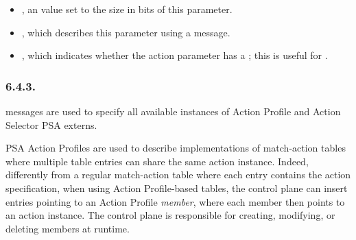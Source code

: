\documentclass[11pt]{article}
\begin{document}
{\begin{itemize}
\begin{itemize}[noitemsep,topsep=\mdcompacttopsep]
\item{}, an  value set to the size in bits of this parameter.%

\item{}, which describes this parameter using a  message.%

\item{}, which indicates whether the action parameter has a
; this is useful for
.%
\end{itemize}%
\end{itemize}%

\subsubsection{6.4.3.\hspace*{0.5em}}\label{sec-p4info-action-profile}%

\noindent{} messages are used to specify all available instances of Action
Profile and Action Selector PSA externs.%

PSA Action Profiles are used to describe implementations of match-action tables
where multiple table entries can share the same action instance. Indeed,
differently from a regular match-action table where each entry contains the
action specification, when using Action Profile-based tables, the control plane
can insert entries pointing to an Action Profile \emph{member}, where each member
then points to an action instance. The control plane is responsible for
creating, modifying, or deleting members at runtime.%

}
\end{document}
